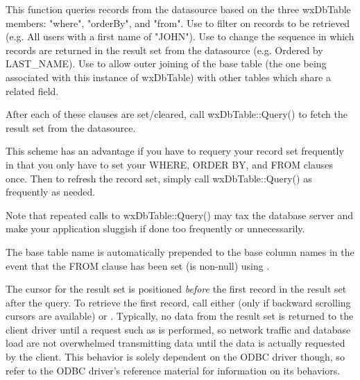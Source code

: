 


This function queries records from the datasource based on the three
wxDbTable members: "where", "orderBy", and "from".  Use
 to filter on
records to be retrieved (e.g. All users with a first name of "JOHN").
Use  to
change the sequence in which records are returned in the result set from
the datasource (e.g. Ordered by LAST\_NAME).  Use
 to allow outer
joining of the base table (the one being associated with this instance of
wxDbTable) with other tables which share a related field.

After each of these clauses are set/cleared, call wxDbTable::Query() to
fetch the result set from the datasource.

This scheme has an advantage if you have to requery your record set
frequently in that you only have to set your WHERE, ORDER BY, and FROM
clauses once.  Then to refresh the record set, simply call wxDbTable::Query()
as frequently as needed.

Note that repeated calls to wxDbTable::Query() may tax the database
server and make your application sluggish if done too frequently or
unnecessarily.

The base table name is automatically prepended to the base column names in
the event that the FROM clause has been set (is non-null) using
.

The cursor for the result set is positioned {\it before} the first record in
the result set after the query.  To retrieve the first record, call either
 (only if backward scrolling
cursors are available) or
.  Typically, no data from the
result set is returned to the client driver until a request such as
 is performed, so network
traffic and database load are not overwhelmed transmitting data until the
data is actually requested by the client.  This behavior is solely dependent
on the ODBC driver though, so refer to the ODBC driver's reference material
for information on its behaviors.

